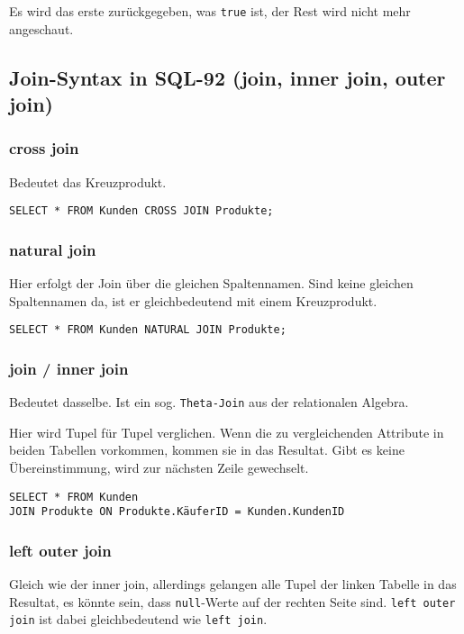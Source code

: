 Es wird das erste zurückgegeben, was \texttt{true} ist, der Rest wird nicht mehr angeschaut.

\subsection{Join-Syntax in SQL-92 (join, inner join, outer join)}
\label{sec:join}

\subsubsection{cross join}
Bedeutet das Kreuzprodukt.

\begin{lstlisting}[caption={Cross Join}]
SELECT * FROM Kunden CROSS JOIN Produkte;
\end{lstlisting}

\subsubsection{natural join}
Hier erfolgt der Join über die gleichen Spaltennamen. Sind keine gleichen Spaltennamen da, ist er gleichbedeutend mit einem Kreuzprodukt.

\begin{lstlisting}[caption={Natural Join}]
SELECT * FROM Kunden NATURAL JOIN Produkte;
\end{lstlisting}

\subsubsection{join / inner join}
Bedeutet dasselbe. Ist ein sog. \texttt{Theta-Join} aus der relationalen Algebra.


Hier wird Tupel für Tupel verglichen. Wenn die zu vergleichenden Attribute in beiden Tabellen vorkommen, kommen sie in das Resultat. Gibt es keine Übereinstimmung, wird zur nächsten Zeile gewechselt.

\begin{lstlisting}[caption={JOIN ON Beispiel}]
SELECT * FROM Kunden
JOIN Produkte ON Produkte.KäuferID = Kunden.KundenID
\end{lstlisting}

\subsubsection{left outer join}
Gleich wie der inner join, allerdings gelangen alle Tupel der linken Tabelle in das Resultat, es könnte sein, dass \texttt{null}-Werte auf der rechten Seite sind. \texttt{left outer join} ist dabei gleichbedeutend wie \texttt{left join}.

